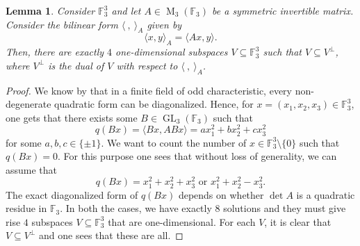 \documentclass{eptcs}
\newtheorem{lemma}[theorem]{Lemma}
\theoremstyle{remark}
\theoremstyle{definition}
\DeclareMathOperator{\GL}{GL}
\DeclareMathOperator{\M}{M}
\begin{document}
\begin{lemma}
  \label{le:mod3_codes}
  Consider $\mathbb{F}_{3}^{3}$ and let $A \in \M_{3}(\mathbb{F}_{3})$ be a symmetric invertible matrix. 
  Consider the bilinear form $\langle\ , \ \rangle_{A}$ given by 
  \begin{equation}
      \langle x,y \rangle _{A} =  \langle A x, y \rangle.
  \end{equation}
  Then, there are exactly $4$ one-dimensional subspaces $V \subseteq \mathbb{F}_{3}^{3}$ such that $V \subseteq V^{\perp}$, where $V^{\perp}$ is the dual of $V$ with respect to $\langle \ , \ \rangle_{A}$.
\end{lemma}
\begin{proof}
    We know by \cite{lidl1997finite} that in a finite field of odd characteristic, every non-degenerate quadratic form can be diagonalized.
    Hence, for $x = (x_{1},x_{2},x_{3}) \in \mathbb{F}_{3}^{3}$, one gets that there exists some $B \in \GL_{3}(\mathbb{F}_{3})$ such that 
    \begin{equation}
	q(B x) = \langle Bx, ABx \rangle = a x_{1}^{2} + bx_{2}^{2} + c x_{3}^{2}
    \end{equation}
    for some $a,b,c \in \{\pm 1 \}$. 
We want to count the number of $x \in \mathbb{F}_{3}^{3}\setminus \{0\}$ such that $q(Bx) = 0$.
    For this purpose one sees that without loss of generality, we can assume that 
    \begin{equation}
        q(Bx) = x_{1}^{2} + x_{2}^{2} + x_{3}^{2} \text{ or } x_{1}^{2} + x_{2}^{2} - x_{3}^{2}.
    \end{equation}
    The exact diagonalized form of $q(Bx)$ depends on whether $\det A$ is a quadratic residue in $\mathbb{F}_{3}$.
    In both the cases, we have exactly $8$ solutions and they must give rise $4$ subspaces $V \subseteq \mathbb{F}_{3}^{3}$ that are one-dimensional. For each $V$, it is clear that $V \subseteq V^{\perp}$ and one sees that these are all.
\end{proof}
\end{document}
